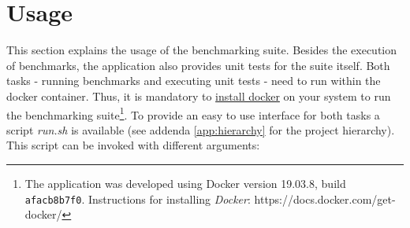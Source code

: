 \section{Usage}\label{sec:benchmarks_usage}
This section explains the usage of the benchmarking suite. Besides the execution of benchmarks, the application also provides unit tests for the suite itself. Both tasks - running benchmarks and executing unit tests - need to run within the docker container. Thus, it is mandatory to \href{https://docs.docker.com/get-docker/}{install docker} on your system to run the benchmarking suite\footnote{The application was developed using Docker version 19.03.8, build \texttt{afacb8b7f0}. Instructions for installing \textit{Docker}: https://docs.docker.com/get-docker/}. To provide an easy to use interface for both tasks a script \textit{run.sh} is available (see addenda \ref{app:hierarchy} for the project hierarchy). This script can be invoked with different arguments:

